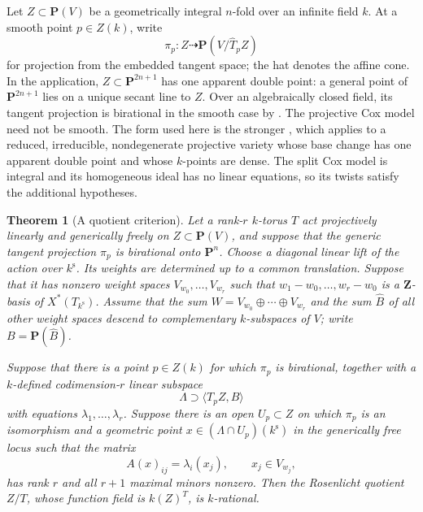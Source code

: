 \documentclass[11pt]{article}
\newtheorem{theorem}{Theorem}[section]
\theoremstyle{remark}
\newcommand{\PP}{\mathbf P}
\newcommand{\Z}{\mathbf Z}
\newcommand{\ks}{k^{\mathrm s}}
\begin{document}
Let \(Z\subset\PP(V)\) be a geometrically integral \(n\)-fold over an
infinite field \(k\).  At a smooth point \(p\in Z(k)\), write
\begin{equation}
 \pi_p:Z\dashrightarrow\PP(V/\widehat T_pZ)
 \label{eq:tangent-projection}
\end{equation}
for projection from the embedded tangent space; the hat denotes the affine
cone.  In the application, \(Z\subset\PP^{2n+1}\) has one apparent double
point: a general point of \(\PP^{2n+1}\) lies on a unique secant line to
\(Z\).  Over an algebraically closed field, its tangent projection is
birational in the smooth case by \cite[Corollary~4.2]{CMR}.  The projective
Cox model need not be smooth.  The form used here is the stronger
\cite[Theorem~2.4]{TZ}, which applies to a reduced, irreducible, nondegenerate projective variety
whose base change has one apparent double point and whose \(k\)-points
are dense.  The split Cox model is integral and its homogeneous ideal has
no linear equations, so its twists satisfy the additional hypotheses.

\begin{theorem}[A quotient criterion]
\label{thm:torus-quotient}
%
Let a rank-\(r\) \(k\)-torus \(T\) act projectively linearly and generically
freely on \(Z\subset\PP(V)\), and suppose that the generic tangent projection
\(\pi_p\) is birational onto \(\PP^n\).  Choose a diagonal linear lift of the
action over \(\ks\).  Its weights are determined up to a common translation.
Suppose that it has nonzero weight spaces
\(V_{w_0},\ldots,V_{w_r}\) such that
\(w_1-w_0,\ldots,w_r-w_0\) is a \(\Z\)-basis of
\(X^*(T_{\ks})\).  Assume that the sum
\(W=V_{w_0}\oplus\cdots\oplus V_{w_r}\) and the sum \(\widehat B\) of all
other weight spaces descend to complementary \(k\)-subspaces of \(V\); write
\(B=\PP(\widehat B)\).

Suppose that there is a point \(p\in Z(k)\) for which \(\pi_p\) is
birational, together with a \(k\)-defined codimension-\(r\) linear subspace
\[
 \Lambda\supset\langle T_pZ,B\rangle
\]
with equations \(\lambda_1,\ldots,\lambda_r\).  Suppose there is an open
\(U_p\subset Z\) on which \(\pi_p\) is an isomorphism and a geometric point
\(x\in(\Lambda\cap U_p)(\ks)\) in the generically free locus such that the
matrix
\begin{equation}
 A(x)_{ij}=\lambda_i(x_j),\qquad x_j\in V_{w_j},
 \label{eq:coefficient-matrix}
\end{equation}
has rank \(r\) and all \(r+1\) maximal minors nonzero.  Then the Rosenlicht
quotient \(Z/T\), whose function field is \(k(Z)^T\), is \(k\)-rational.
\end{theorem}
\end{document}
